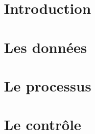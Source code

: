 \documentclass[12pt,a4paper]{article}
\begin{document}
%

\tableofcontents

\clearpage


\section{Introduction}


\section{Les données}


\section{Le processus}


\section{Le contrôle}


\newpage

\printbibliography
\end{document}
